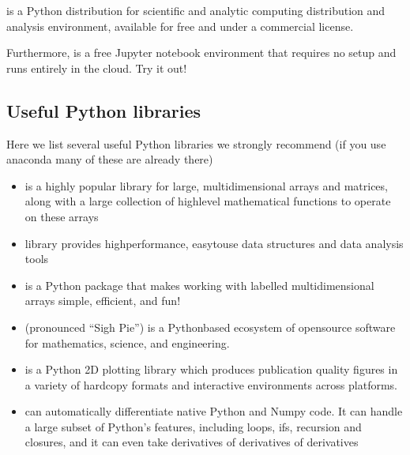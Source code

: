 \documentclass[letterpaper,10pt,english]{sphinxmanual}
\begin{document}
is a Python
distribution for scientific and analytic computing distribution and
analysis environment, available for free and under a commercial
license.

Furthermore,  is a free Jupyter notebook environment that requires
no setup and runs entirely in the cloud. Try it out!


\subsection{Useful Python libraries}
\label{\detokenize{chapter2:useful-python-libraries}}
Here we list several useful Python libraries we strongly recommend (if you use anaconda many of these are already there)
\begin{itemize}
\item {} 
 is a highly popular library for large, multi\sphinxhyphen{}dimensional arrays and matrices, along with a large collection of high\sphinxhyphen{}level mathematical functions to operate on these arrays

\item {} 
 library provides high\sphinxhyphen{}performance, easy\sphinxhyphen{}to\sphinxhyphen{}use data structures and data analysis tools

\item {} 
 is a Python package that makes working with labelled multi\sphinxhyphen{}dimensional arrays simple, efficient, and fun!

\item {} 
 (pronounced “Sigh Pie”) is a Python\sphinxhyphen{}based ecosystem of open\sphinxhyphen{}source software for mathematics, science, and engineering.

\item {} 
 is a Python 2D plotting library which produces publication quality figures in a variety of hardcopy formats and interactive environments across platforms.

\item {} 
 can automatically differentiate native Python and Numpy code. It can handle a large subset of Python’s features, including loops, ifs, recursion and closures, and it can even take derivatives of derivatives of derivatives


\end{itemize}
\end{document}
